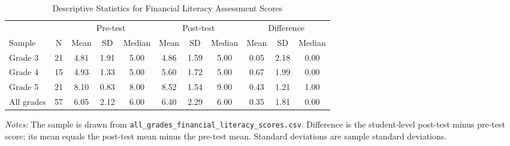 \begin{table}[!htbp]\centering
\caption{Descriptive Statistics for Financial Literacy Assessment Scores}
\label{tab:financial_literacy_descriptive_statistics}
\begin{tabular}{lcccccccccc}
\toprule
& & \multicolumn{3}{c}{Pre-test} & \multicolumn{3}{c}{Post-test} & \multicolumn{3}{c}{Difference} \\
\cmidrule(lr){3-5}\cmidrule(lr){6-8}\cmidrule(lr){9-11}
Sample & N & Mean & SD & Median & Mean & SD & Median & Mean & SD & Median \\
\midrule
Grade 3 & 21 & 4.81 & 1.91 & 5.00 & 4.86 & 1.59 & 5.00 & 0.05 & 2.18 & 0.00 \\
Grade 4 & 15 & 4.93 & 1.33 & 5.00 & 5.60 & 1.72 & 5.00 & 0.67 & 1.99 & 0.00 \\
Grade 5 & 21 & 8.10 & 0.83 & 8.00 & 8.52 & 1.54 & 9.00 & 0.43 & 1.21 & 1.00 \\
All grades & 57 & 6.05 & 2.12 & 6.00 & 6.40 & 2.29 & 6.00 & 0.35 & 1.81 & 0.00 \\
\bottomrule
\end{tabular}
\begin{minipage}{0.95\linewidth}
\vspace{0.2cm}\footnotesize \emph{Notes:} The sample is drawn from \texttt{all\_grades\_financial\_literacy\_scores.csv}. Difference is the student-level post-test minus pre-test score; its mean equals the post-test mean minus the pre-test mean. Standard deviations are sample standard deviations.
\end{minipage}
\end{table}
